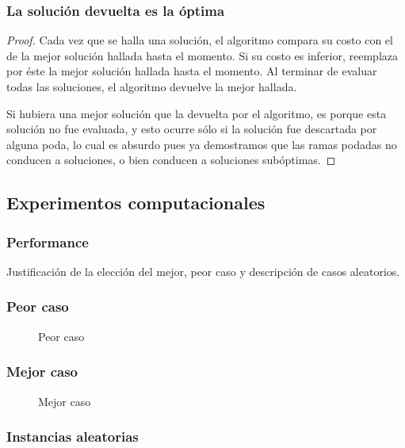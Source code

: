 \documentclass[a4paper, 10pt, twoside]{article}
\begin{document}
\subsubsection{La solución devuelta es la óptima}

\begin{proof}
    Cada vez que se halla una solución, el algoritmo compara su costo con el de la mejor solución hallada hasta el momento. Si su costo es inferior, reemplaza por éste la mejor solución hallada hasta el momento. Al terminar de evaluar todas las soluciones, el algoritmo devuelve la mejor hallada.

    Si hubiera una mejor solución que la devuelta por el algoritmo, es porque esta solución no fue evaluada, y esto ocurre sólo si la solución fue descartada por alguna poda, lo cual es absurdo pues ya demostramos que las ramas podadas no conducen a soluciones, o bien conducen a soluciones subóptimas.
\end{proof}


\subsection{Experimentos computacionales}

\subsubsection{Performance}
Justificación de la elección del mejor, peor caso y descripción de casos aleatorios.

\subsubsection{Peor caso}

\begin{figure}[H]
  \centering
  
  \caption{Peor caso}
\end{figure}


\subsubsection{Mejor caso}

\begin{figure}[H]
  \centering
  
  \caption{Mejor caso}
\end{figure}


\subsubsection{Instancias aleatorias}
\end{document}

